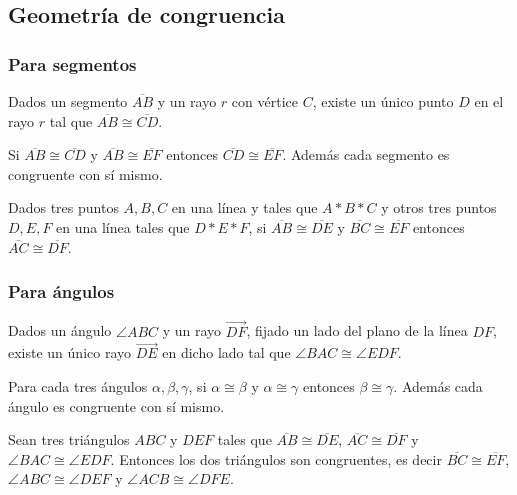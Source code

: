 \subsection{Geometría de congruencia}

\subsubsection{Para segmentos}

\begin{ax}\label{C1}
  Dados un segmento $\overline{AB}$ y un rayo $r$ con vértice $C$, existe un
  único punto $D$ en el rayo $r$ tal que $\overline{AB}\cong\overline{CD}$.
\end{ax}

\begin{ax}\label{C2}
  Si $\overline{AB}\cong\overline{CD}$ y $\overline{AB}\cong\overline{EF}$
  entonces $\overline{CD}\cong\overline{EF}$. Además cada segmento es congruente
  con sí mismo.
\end{ax}

\begin{ax}[Suma]\label{C3}
  Dados tres puntos $A, B, C$ en una línea y tales que $A * B * C$ y otros tres
  puntos $D, E, F$ en una línea tales que $D * E * F$, si
  $\overline{AB}\cong\overline{DE}$ y $\overline{BC}\cong\overline{EF}$ entonces
  $\overline{AC}\cong\overline{DF}$.
\end{ax}

\subsubsection{Para ángulos}

\begin{ax}\label{C4}
  Dados un ángulo $\angle ABC$ y un rayo $\overrightarrow{DF}$, fijado un lado
  del plano de la línea $DF$, existe un único rayo $\overrightarrow{DE}$ en
  dicho lado tal que $\angle BAC\cong\angle EDF$.

\end{ax}

\begin{ax}\label{C5}
  Para cada tres ángulos $\alpha, \beta, \gamma$, si $\alpha\cong\beta$ y
  $\alpha\cong\gamma$ entonces $\beta\cong\gamma$. Además cada ángulo es
  congruente con sí mismo.
\end{ax}

\begin{ax}[SAS]\label{C6}
  Sean tres triángulos $ABC$ y $DEF$ tales que
  $\overline{AB}\cong\overline{DE}$, $\overline{AC}\cong\overline{DF}$ y $\angle
  BAC\cong\angle EDF$. Entonces los dos triángulos son congruentes, es decir
  $\overline{BC}\cong\overline{EF}$, $\angle ABC\cong\angle DEF$ y $\angle
  ACB\cong\angle DFE$.
\end{ax}

